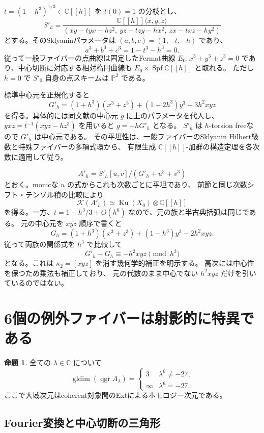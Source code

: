 \documentclass[a4paper,11pt]{ltjsarticle}
\theoremstyle{definition}
\newtheorem{theorem}{命題}[section]
\newcommand{\CC}{\mathbb C}
\newcommand{\PP}{\mathbb P}
\newcommand{\Ku}{\operatorname{Ku}}
\newcommand{\qgr}{\operatorname{qgr}}
\begin{document}
$t=(1-h^3)^{1/3}\in\CC[[h]]$ を $t(0)=1$ の分枝とし、
\[
 S'_h=\frac{\CC[[h]]\langle x,y,z\rangle}
 {(xy-tyx-hz^2,\ yz-tzy-hx^2,\ zx-txz-hy^2)}
\]
とする。そのSklyaninパラメータは $(a,b,c)=(1,-t,-h)$ であり、
\[
 a^3+b^3+c^3=1-t^3-h^3=0.
\]
従って一般ファイバーの点曲線は固定したFermat曲線
$E_0:x^3+y^3+z^3=0$ であり、中心切断に対応する相対楕円曲線も
$E_0\times\operatorname{Spf}\mathbb C[[h]]$ と取れる。
ただし $h=0$ で $S'_0$ 自身の点スキームは $\PP^2$ である。

標準中心元\cite[Lemma 2.19]{WWY}を正規化すると
\[
 G'_h=(1+h^3)(x^3+z^3)+(1-2h^3)y^3-3h^2xyz
\]
を得る。具体的には同文献の中心元 $g$ に上のパラメータを代入し、
$yxz=t^{-1}(xyz-hz^3)$ を用いると $g=-hG'_h$ となる。
$S'_h$ は $h$-torsion freeなので $G'_h$ は中心元である。
その平坦性は、一般ファイバーのSklyanin Hilbert級数と特殊ファイバーの多項式環から、
有限生成 $\CC[[h]]$-加群の構造定理を各次数に適用して従う。

\[
 A'_h=S'_h[u,v]/(G'_h+u^3+v^3)
\]
とおく。monicな $u$ の式からこれも次数ごとに平坦であり、
前節と同じ次数シフト・テンソル積の比較により
\[
 \mathcal K(A'_h)\simeq\Ku(X_0)\otimes\CC[[h]]
\]
を得る。一方、$t=1-h^3/3+O(h^6)$ なので、元の族と半古典括弧は同じである。
元の中心元を $xyz$ 順序で書くと
\[
 G_h=(1+h^3)(x^3+z^3)+(1-h^3)y^3-2h^2xyz.
\]
従って両族の関係式を $h^3$ で比較して
\[
 G'_h-G_h\equiv-h^2xyz\pmod{h^3}
\]
となる。これは $\kappa_2=[xyz]$ を消す幾何学的補正を明示する。
高次には中心性を保つため乗法も補正しており、
元の代数のまま中心でない $h^2xyz$ だけを引いているのではない。

\section{6個の例外ファイバーは射影的に特異である}\label{sec:exceptional}

\begin{theorem}\label{thm:exceptional}
全ての $\lambda\in\CC$ について
\[
 \operatorname{gldim}(\qgr A_\lambda)=
 \begin{cases}
 3&\lambda^6\ne-27,\\
 \infty&\lambda^6=-27.
 \end{cases}
\]
ここで大域次元はcoherent対象間のExtによるホモロジー次元である。
\end{theorem}

\subsection{Fourier変換と中心切断の三角形}
\end{document}
